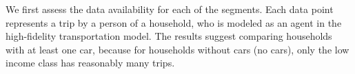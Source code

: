 We first assess the data availability for each of the segments. Each data point represents a trip by a person of a household, who is  modeled as an agent in the high-fidelity transportation model. The results suggest comparing households with at least one car, because for households without cars (no cars), only the low income class has reasonably many trips. 






 
